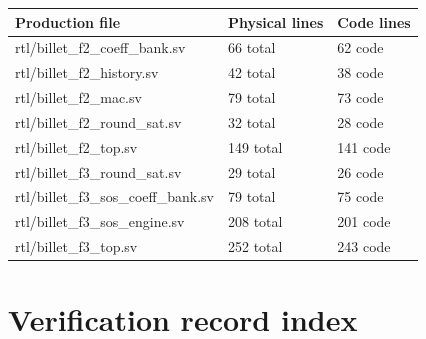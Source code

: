 \documentclass[11pt,a4paper]{article}
\begin{document}
{\small\renewcommand{\arraystretch}{1.18}\begin{longtable}{@{}L{0.55\textwidth}|L{0.18\textwidth}|L{0.18\textwidth}@{}}\toprule

\textbf{Production file} & \textbf{Physical lines} & \textbf{Code lines}\\\midrule\endhead

rtl/\allowbreak{}billet\_\allowbreak{}f2\_\allowbreak{}coeff\_\allowbreak{}bank.sv & 66 total & 62 code\\[2pt]\hline

rtl/\allowbreak{}billet\_\allowbreak{}f2\_\allowbreak{}history.sv & 42 total & 38 code\\[2pt]\hline

rtl/\allowbreak{}billet\_\allowbreak{}f2\_\allowbreak{}mac.sv & 79 total & 73 code\\[2pt]\hline

rtl/\allowbreak{}billet\_\allowbreak{}f2\_\allowbreak{}round\_\allowbreak{}sat.sv & 32 total & 28 code\\[2pt]\hline

rtl/\allowbreak{}billet\_\allowbreak{}f2\_\allowbreak{}top.sv & 149 total & 141 code\\[2pt]\hline

rtl/\allowbreak{}billet\_\allowbreak{}f3\_\allowbreak{}round\_\allowbreak{}sat.sv & 29 total & 26 code\\[2pt]\hline

rtl/\allowbreak{}billet\_\allowbreak{}f3\_\allowbreak{}sos\_\allowbreak{}coeff\_\allowbreak{}bank.sv & 79 total & 75 code\\[2pt]\hline

rtl/\allowbreak{}billet\_\allowbreak{}f3\_\allowbreak{}sos\_\allowbreak{}engine.sv & 208 total & 201 code\\[2pt]\hline

rtl/\allowbreak{}billet\_\allowbreak{}f3\_\allowbreak{}top.sv & 252 total & 243 code\\[2pt]\hline

\bottomrule\end{longtable}}

\section{Verification record index}
\end{document}
